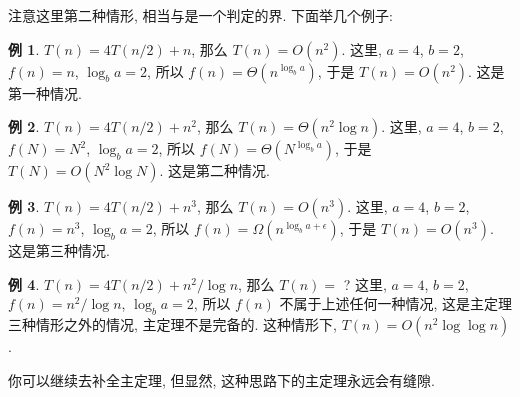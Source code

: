 \documentclass[a4paper]{ctexart}
\theoremstyle{definition}
\theoremstyle{definition}
\newtheorem{example}{例}[section]
\begin{document}
注意这里第二种情形, 相当与是一个判定的界. 下面举几个例子:

\begin{example}
$T(n) = 4 T(n / 2) + n$, 那么 $T(n) = O(n^2)$.
这里, $a = 4$, $b = 2$, $f(n) = n$, $\log_b a = 2$, 所以 $f(n) = \Theta(n^{\log_b a})$, 于是 $T(n) = O(n^2)$. 这是第一种情况. 
\end{example}

\begin{example}
$T(n) = 4 T(n / 2) + n^2$, 那么 $T(n) = \Theta(n^2\log n)$.
  这里, $a = 4$, $b = 2$, $f(N) = N^2$, $\log_b a = 2$, 所以 $f(N) = \Theta(N^{\log_b a})$, 于是 $T(N) = O(N^2 \log N)$. 这是第二种情况.
\end{example}

\begin{example}
$T(n) = 4 T(n / 2) + n^3$, 那么 $T(n) = O(n^3)$.
  这里, $a = 4$, $b = 2$, $f(n) = n^3$, $\log_b a = 2$, 所以 $f(n) = \Omega(n^{\log_b a + \epsilon})$, 于是 $T(n) = O(n^3)$. 这是第三种情况.
\end{example}

\begin{example}
$T(n) = 4 T(n / 2) + n^2 / \log n$, 那么 $T(n) = $ ?  
  这里, $a = 4$, $b = 2$, $f(n) = n^2 / \log n$, $\log_b a = 2$, 所以 $f(n)$ 不属于上述任何一种情况, 这是主定理三种情形之外的情况, 
  主定理不是完备的. 这种情形下, 
  $T(n) = O(n^2 \log \log n)$. 
\end{example}

你可以继续去补全主定理, 但显然, 这种思路下的主定理永远会有缝隙. 





\end{document}
